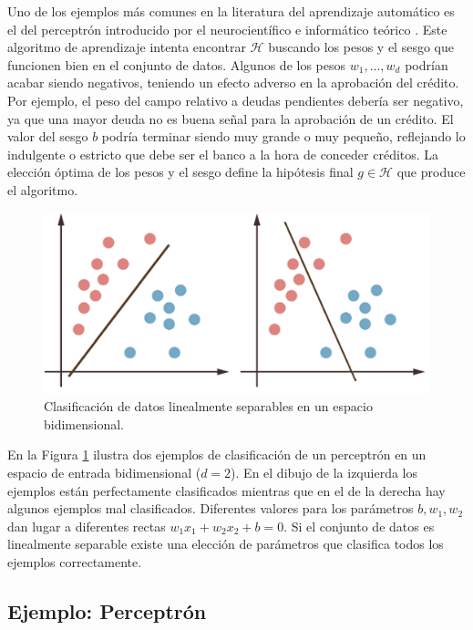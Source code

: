 \documentclass[oneside,openright,titlepage,numbers=noenddot,openany,headinclude,footinclude=true,
cleardoublepage=empty,abstractoff,BCOR=5mm,paper=a4,fontsize=12pt,main=spanish]{scrreprt}
\begin{document}
Uno de los ejemplos más comunes en la literatura del aprendizaje automático es el del perceptrón introducido por el neurocientífico e informático teórico \cite{perceptron1957}. Este algoritmo de aprendizaje intenta encontrar $\mathcal{H}$ buscando los pesos y el sesgo que funcionen bien en el conjunto de datos. Algunos de los pesos $w_1,\dots,w_d$ podrían acabar siendo negativos, teniendo un efecto adverso en la aprobación del crédito. Por ejemplo, el peso del campo relativo a deudas pendientes debería ser negativo, ya que una mayor deuda no es buena señal para la aprobación de un crédito. El valor del sesgo $b$ podría terminar siendo muy grande o muy pequeño, reflejando lo indulgente o estricto que debe ser el banco a la hora de conceder créditos. La elección óptima de los pesos y el sesgo define la hipótesis final $g \in \mathcal{H}$ que produce el algoritmo.\\

\begin{figure}[h]
	\centering
	\includegraphics[width=12.1cm]{gbclassified.png}
	\caption{Clasificación de datos linealmente separables en un espacio bidimensional.}
    \label{fig:linsep}
\end{figure}

En la Figura \ref{fig:linsep} ilustra dos ejemplos de clasificación de un perceptrón en un espacio de entrada bidimensional ($d=2$). En el dibujo de la izquierda los ejemplos están perfectamente clasificados mientras que en el de la derecha hay algunos ejemplos mal clasificados. Diferentes valores para los parámetros $b,w_1,w_2$ dan lugar a diferentes rectas $w_1x_1+w_2x_2+b=0$. Si el conjunto de datos es linealmente separable existe una elección de parámetros que clasifica todos los ejemplos correctamente.

\subsection{Ejemplo: Perceptrón} \label{subsec:perceptron}
\end{document}
